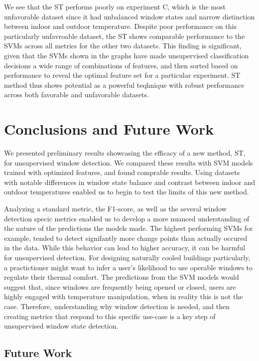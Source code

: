 \documentclass[sigconf]{acmart}
\begin{document}
We see that the ST performs poorly on experiment C, which is the most
unfavorable dataset since it had unbalanced window states and narrow
distinction between indoor and outdoor temperature. Despite poor
performance on this particularly unfavroable dataset, the ST shows
comparable performance to the SVMs across all metrics for the other two
datasets. This finding is significant, given that the SVMs shown in the
graphs have made unsupervised classification decisions a wide range of
combinations of features, and then sorted based on performance to reveal
the optimal feature set for a particular experiment. ST method thus
shows potential as a powerful teqhnique with robust performance across
both favorable and unfavorable datasets.

\hypertarget{conclusions-and-future-work}{%
\section{Conclusions and Future
Work}\label{conclusions-and-future-work}}

We presented preliminary results showcasing the efficacy of a new
method, ST, for unsupervised window detection. We compared these results
with SVM models trained with optimized features, and found comprable
results. Using datasets with notable differences in window state balance
and contrast between indoor and outdoor temperatures enabled us to begin
to test the limits of this new method.

Analyzing a standard metric, the F1-score, as well as the several window
detection specic metrics enabled us to develop a more nuanced
understanding of the nature of the predictions the models made. The
highest performing SVMs for example, tended to detect signifantly more
change points than actually occured in the data. While this behavior can
lead to higher accuracy, it can be harmful for unsupervised detection.
For designing naturally cooled buildings particularly, a practictioner
might want to infer a user's likelihood to use operable windows to
regulate their thermal comfort. The predictions from the SVM models
would suggest that, since windows are frequently being opened or closed,
users are highly engaged with temperature manipulation, when in reality
this is not the case. Therefore, understanding why window detection is
needed, and then creating metrics that respond to this specific use-case
is a key step of unsupervised window state detection.

\hypertarget{future-work}{%
\subsection{Future Work}\label{future-work}}
\end{document}
